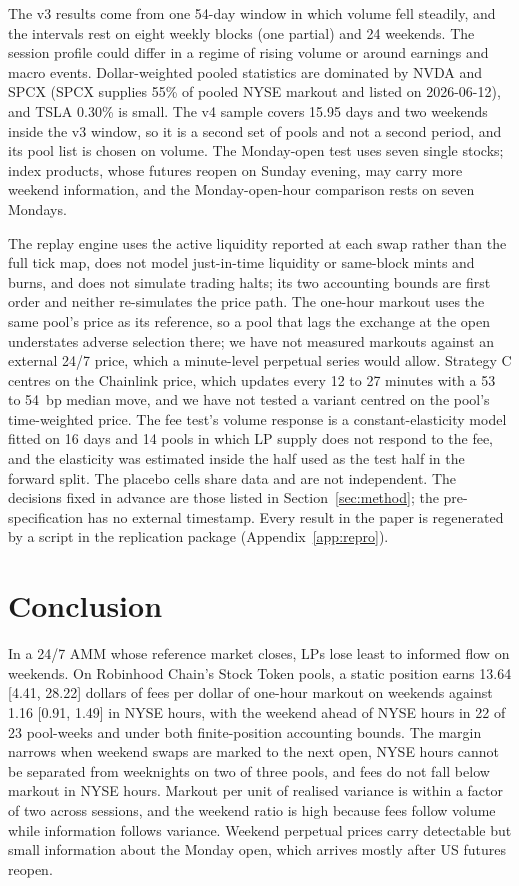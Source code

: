 \documentclass[11pt]{article}
\begin{document}
The v3 results come from one 54-day window in which volume fell steadily, and the intervals rest on eight weekly blocks (one partial) and 24 weekends. The session profile could differ in a regime of rising volume or around earnings and macro events. Dollar-weighted pooled statistics are dominated by NVDA and SPCX (SPCX supplies 55\% of pooled NYSE markout and listed on 2026-06-12), and TSLA 0.30\% is small. The v4 sample covers 15.95 days and two weekends inside the v3 window, so it is a second set of pools and not a second period, and its pool list is chosen on volume. The Monday-open test uses seven single stocks; index products, whose futures reopen on Sunday evening, may carry more weekend information, and the Monday-open-hour comparison rests on seven Mondays.

The replay engine uses the active liquidity reported at each swap rather than the full tick map, does not model just-in-time liquidity or same-block mints and burns, and does not simulate trading halts; its two accounting bounds are first order and neither re-simulates the price path. The one-hour markout uses the same pool's price as its reference, so a pool that lags the exchange at the open understates adverse selection there; we have not measured markouts against an external 24/7 price, which a minute-level perpetual series would allow. Strategy C centres on the Chainlink price, which updates every 12 to 27 minutes with a 53 to 54~bp median move, and we have not tested a variant centred on the pool's time-weighted price. The fee test's volume response is a constant-elasticity model fitted on 16 days and 14 pools in which LP supply does not respond to the fee, and the elasticity was estimated inside the half used as the test half in the forward split. The placebo cells share data and are not independent. The decisions fixed in advance are those listed in Section~\ref{sec:method}; the pre-specification has no external timestamp. Every result in the paper is regenerated by a script in the replication package (Appendix~\ref{app:repro}).

\section{Conclusion}\label{sec:conclusion}

In a 24/7 AMM whose reference market closes, LPs lose least to informed flow on weekends. On Robinhood Chain's Stock Token pools, a static position earns 13.64 [4.41, 28.22] dollars of fees per dollar of one-hour markout on weekends against 1.16 [0.91, 1.49] in NYSE hours, with the weekend ahead of NYSE hours in 22 of 23 pool-weeks and under both finite-position accounting bounds. The margin narrows when weekend swaps are marked to the next open, NYSE hours cannot be separated from weeknights on two of three pools, and fees do not fall below markout in NYSE hours. Markout per unit of realised variance is within a factor of two across sessions, and the weekend ratio is high because fees follow volume while information follows variance. Weekend perpetual prices carry detectable but small information about the Monday open, which arrives mostly after US futures reopen.
\end{document}
